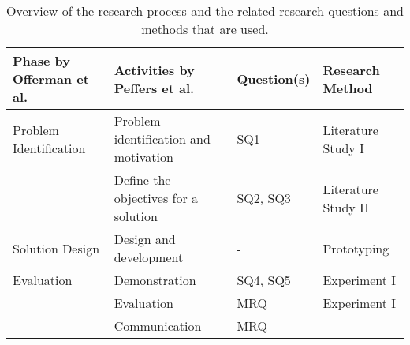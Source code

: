 \begin{table}[h]
    \small
    \caption[Overview of research process]{Overview of the research process and the related research questions and methods that are used.}\label{tab:research_approach}
    \begin{tabular}{>{\raggedright}m{75pt} >{\raggedright}m{107pt} >{\raggedright}m{60pt} >{\raggedright\arraybackslash}m{100pt}}
        \toprule
        Phase by Offerman et al. 
        & Activities by Peffers et al. 
        & Question(s) 
        & Research Method \\
        \midrule
        Problem Identification 
        & Problem identification and motivation 
        & SQ1
        & Literature Study I \\
        & Define the objectives for a solution 
        & SQ2, SQ3 & Literature Study II \\
        \midrule
        Solution Design 
        & Design and development
        & -
        & Prototyping \\
        \midrule
        Evaluation 
        & Demonstration 
        & SQ4, SQ5
        & Experiment I \\
        & Evaluation & MRQ & Experiment I \\
        \midrule
        - & Communication & MRQ & - \\
        \bottomrule
    \end{tabular}
\end{table}

